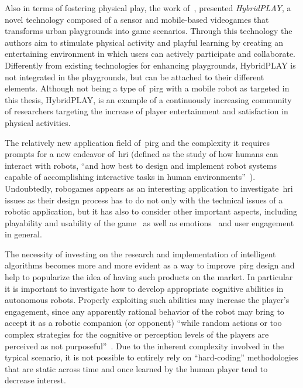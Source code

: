 Also in terms of fostering physical play, the work of~\cite{diaz_hybridplay:_2016}, presented \textit{HybridPLAY}, a novel technology composed of a sensor and mobile-based videogames that transforms urban playgrounds into game scenarios. Through this technology the authors aim to stimulate physical activity and playful learning by creating an entertaining environment in which users can actively participate and collaborate. Differently from existing technologies for enhancing playgrounds, HybridPLAY is not integrated in the playgrounds, but can be attached to their different elements. Although not being a type of~\gls{pirg} with a mobile robot as targeted in this thesis, HybridPLAY, is an example of a continuously increasing community of researchers targeting the increase of player entertainment and satisfaction in physical activities.

The relatively new application field of~\gls{pirg} and the complexity it requires prompts for a new endeavor of~\gls{hri} (defined as the study of how humans can interact with robots, ``and how best to design and implement robot systems capable of accomplishing interactive tasks in human environments''~\citep{feil-seifer_human_2009}). Undoubtedly, robogames appears as an interesting application to investigate~\gls{hri} issues as their design process has to do not only with the technical issues of a robotic application, but it has also to consider other important aspects, including playability and usability of the game~\citep{martinoia_physically_2013} as well as emotions~\citep{lamberti_robotic_2018} and user engagement in general.

The necessity of investing on the research and implementation of intelligent algorithms becomes more and more evident as a way to improve~\gls{pirg} design and help to popularize the idea of having such products on the market. In particular it is important to investigate how to develop appropriate cognitive abilities in autonomous robots. Properly exploiting such abilities may increase the player's engagement, since any apparently rational behavior of the robot may bring to accept it as a robotic companion (or opponent) ``while random actions or too complex strategies for the cognitive or perception levels of the players are perceived as not purposeful''~\citep{martinoia_physically_2013}. Due to the inherent complexity involved in the typical scenario, it is not possible to entirely rely on ``hard-coding'' methodologies that are static across time and once learned by the human player tend to decrease interest.

